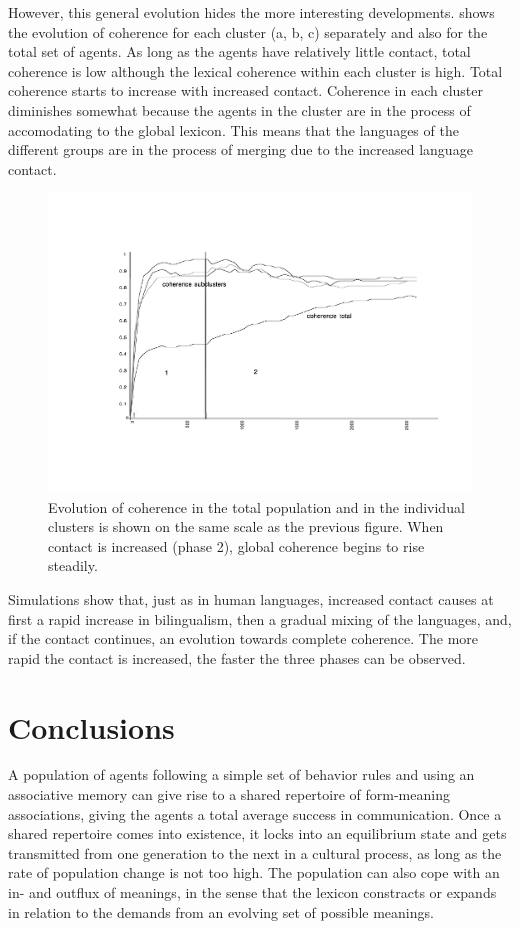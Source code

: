 However, this general evolution hides the more interesting
developments. 
shows the evolution of coherence for each
cluster (a, b, c) separately and
also for the total set of agents. As long as the agents
have relatively little contact, total coherence is low
although the lexical coherence within each cluster is high. 
Total coherence starts to increase with increased contact. Coherence in
each cluster diminishes somewhat because the agents in the
cluster are in the process of accomodating to the global lexicon. 
This means that the
languages of the different groups are in the process of
merging due to the increased language contact.

\begin{figure}[htbp]
  \centerline{\includegraphics[width=.80\textwidth]{chap5/figs/coherence}}
\caption{Evolution of coherence in the total population 
and in the individual clusters is shown on the same
scale as the previous figure. When contact 
is increased (phase 2), global coherence begins to rise steadily.}
\label{figure-coherence-in-space}
\end{figure}
Simulations show that, just as in human languages,
increased contact causes at first a rapid increase in
bilingualism, then a gradual mixing of the languages, and, 
if the contact
continues, an evolution towards complete coherence. 
The more rapid the contact is
increased, the faster the three phases can be observed. 

\section{Conclusions}

A population of agents following a simple set of 
behavior rules and using an associative memory
can give rise to a shared repertoire of form-meaning 
associations, giving the agents a total average success in 
communication. Once a shared repertoire comes
into existence, it locks into an equilibrium state and 
gets transmitted from one generation to the next in a 
cultural process, as long as the rate of population change 
is not too high. The population can also cope with 
an in- and outflux of meanings, in the sense that 
the lexicon constracts or expands in relation to the 
demands from an evolving set of possible meanings.  

